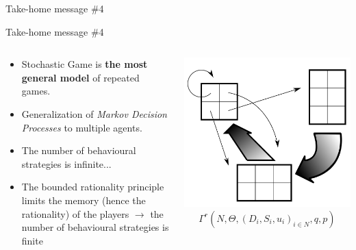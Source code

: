 
\begin{frame}{Take-home message \#4}

    \begin{block}{Take-home message \#4}
        \begin{columns}
            \begin{column}{0.55\textwidth}
                \begin{itemize}
                    \item Stochastic Game is \textbf{the most general model} of
                    repeated games.
                    \item Generalization of \textit{Markov Decision Processes}
                    to multiple agents.
                    \item {\color{orange}The number of behavioural strategies is infinite}...
                    \item The bounded rationality principle limits the memory (hence
                    the rationality) of the players
                    $\to$ {\color{green}the number of behavioural strategies is finite}
                \end{itemize}
            \end{column}
            \begin{column}{0.3\textwidth}
                \begin{center}
                    \includegraphics[width=\textwidth]{img/stochastic.png}
                    \scriptsize{\[ \Gamma^r(N, \Theta, (D_i, S_i, u_i)_{i \in N}, q, p) \]}
                \end{center}
            \end{column}
        \end{columns}

    \end{block}
\end{frame}
